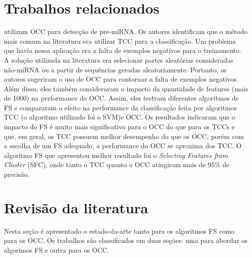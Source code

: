\documentclass{article}
\begin{document}
\section{Trabalhos relacionados} \label{sec_trabalhos_rel}
\citet{Khalifa2016} utilizam OCC para detecção de pre-miRNA. Os autores
identificam que o método mais comum na literatura era utilizar TCC para a
classificação. Um problema que havia nessa aplicação era a falta de exemplos
negativos para o treinamento.  A solução utilizada na literatura era selecionar
partes aleatórias consideradas não-miRNA ou a partir de sequências geradas
aleatoriamente.  Portanto, os autores sugeriram o uso de OCC para contornar a
falta de exemplos negativos.  Além disso, eles também consideraram o impacto da
quantidade de features (mais de 1000) na performance do OCC.  Assim, eles
testram diferentes algoritmos de FS e compararam o efeito na performance da
classificação feita por algoritmos TCC (o algoritmo utilizado foi o SVM)e
OCC. Os resultados indicaram que o impacto do FS é muito mais significativo para
o OCC do que para os TCCs e que, em geral, os TCC possuem melhor desempenho do
que os OCC, porém com a escolha de um FS adequado, a performance do OCC se
aproxima dos TCC. O algoritmo FS que apresentou melhor resultado foi o {\itshape
  Selecting Features from Cluster} (SFC), onde tanto o TCC quanto o OCC
atingiram mais de 95\% de precisão.

\section{Revisão da literatura} \label{sec_revisao}
Nesta seção é apresentado o estado-da-arte tanto para os algoritmos FS como para
os OCC. Os trabalhos são classificados em duas seções: uma para abordar os
algorimos FS e outra para os OCC.
\end{document}
